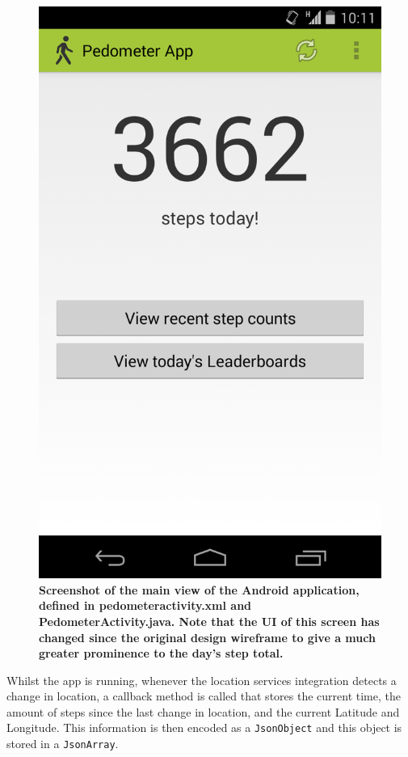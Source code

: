 \documentclass{l4proj}
\begin{document}
\begin{figure}[ht!]
\centering
\includegraphics[scale=0.2]{images/screenshots/appscreen.png}
\caption{\textbf{Screenshot of the main view of the Android application, defined in pedometeractivity.xml and PedometerActivity.java. Note that the UI of this screen has changed since the original design wireframe to give a much greater prominence to the day's step total.}}
\label{impl:dia2}
\end{figure}

Whilst the app is running, whenever the location services integration detects a change in location, a callback method is called that stores the current time, the amount of steps since the last change in location, and the current Latitude and Longitude. This information is then encoded as a \texttt{JsonObject} and this object is stored in a \texttt{JsonArray}. 
\end{document}
